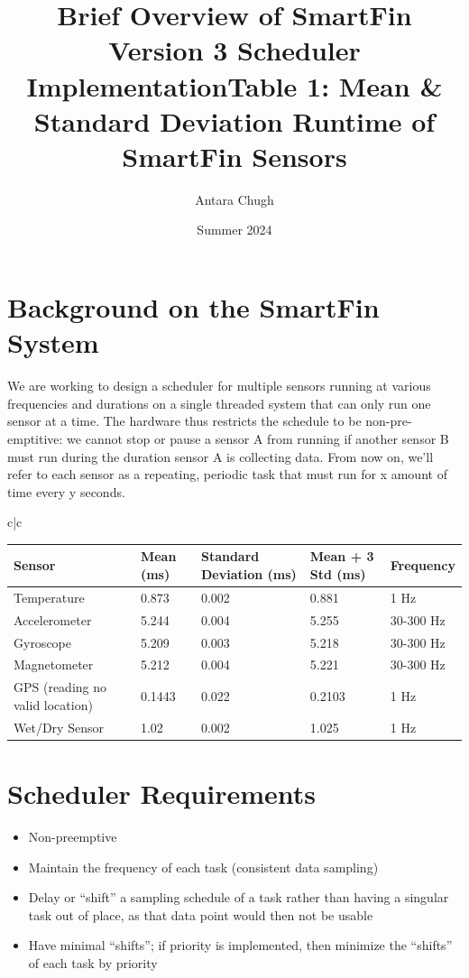 \documentclass{article}
\title{Brief Overview of SmartFin Version 3 Scheduler Implementation}
\author{Antara Chugh}
\date{Summer 2024}
\begin{document}
\maketitle

\section{Background on the SmartFin System}

We are working to design a scheduler for multiple sensors running at various frequencies and durations on a single threaded system that can only run one sensor at a time. The hardware thus restricts the schedule to be non-pre-emptitive: we cannot stop or pause a sensor A from running if another sensor B must run during the duration sensor A is collecting data. From now on, we’ll refer to each sensor as a repeating, periodic task that must run for x amount of time every y seconds. \newline


\title{Table 1: Mean \& Standard Deviation Runtime of SmartFin Sensors}
\newline



\begin{tabular}{c|c}
\hspace{-3 cm}
\begin{tabular}{| l | l | l | l | l |}
\hline
Sensor & Mean (ms) & Standard Deviation (ms) & Mean + 3 Std (ms) & Frequency \\
\hline
Temperature & 0.873 & 0.002 & 0.881 & 1 Hz \\
\hline
Accelerometer & 5.244 & 0.004 & 5.255 & 30-300 Hz \\
\hline
Gyroscope & 5.209 & 0.003 & 5.218 & 30-300 Hz \\
\hline
Magnetometer & 5.212 & 0.004 & 5.221 & 30-300 Hz \\
\hline
GPS (reading no valid location) & 0.1443 & 0.022 & 0.2103 & 1 Hz \\
\hline
Wet/Dry Sensor & 1.02 & 0.002 & 1.025 & 1 Hz \\
\hline

\end{tabular}

\end{tabular}





\section{Scheduler Requirements}
\begin{itemize}
    \item Non-preemptive 
    \item Maintain the frequency of each task (consistent data  sampling) 
    \item Delay or “shift” a sampling schedule of a task rather than having a singular task out of place, as that data point would then not be usable 
    \item Have minimal “shifts”; if priority is implemented, then minimize the “shifts” of each task by priority
\end{itemize}
\end{document}
